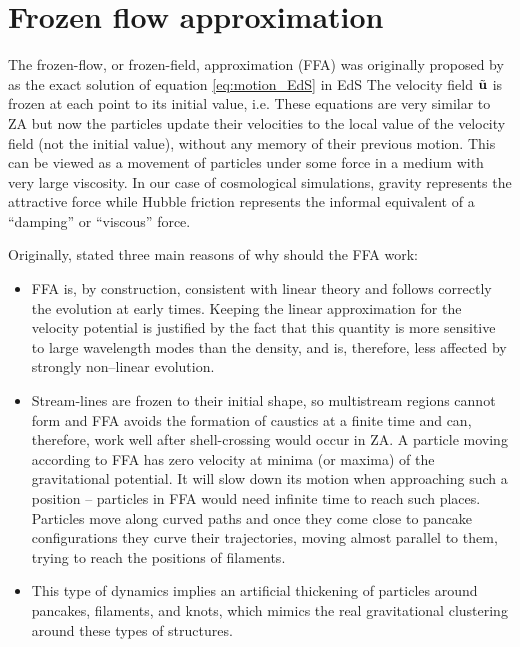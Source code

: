 \section{Frozen flow approximation}
The frozen-flow, or frozen-field, approximation (FFA) was originally proposed by \textcite{Matarrese:1992be} as the exact solution of equation \eqref{eq:motion_EdS} in EdS
The velocity field $\tilde{\mathbf u}$ is frozen at each point to its initial value, i.e.
These equations are very similar to ZA but now the particles update their velocities to the local value of the velocity field (not the initial value), without any memory of their previous motion. This can be viewed as a movement of particles under some force in a medium with very large viscosity. In our case of cosmological simulations, gravity represents the attractive force while Hubble friction represents the informal equivalent of a ``damping'' or ``viscous'' force.

Originally, \textcite{Matarrese:1992be} stated three main reasons of why should the FFA work:
\begin{itemize}
\item FFA is, by construction, consistent with linear theory and follows correctly the evolution at early times. Keeping the linear approximation for the velocity potential is justified by the fact that this quantity is more sensitive to large wavelength modes than the density, and is, therefore, less affected by strongly non--linear evolution.
\item Stream-lines are frozen to their initial shape, so multistream regions cannot form and FFA avoids the formation of caustics at a finite time and can, therefore, work well after shell-crossing would occur in ZA. A particle moving according to FFA has zero velocity at minima (or maxima) of the gravitational potential. It will slow down its motion when approaching such a position -- particles in FFA would need infinite time to reach such places. Particles move along curved paths and once they come close to pancake configurations they curve their trajectories, moving almost parallel to them, trying to reach the positions of filaments.
\item This type of dynamics implies an artificial thickening of particles around pancakes, filaments, and knots, which mimics the real gravitational clustering around these types of structures.
\end{itemize}

